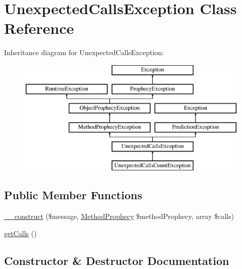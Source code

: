 \hypertarget{class_prophecy_1_1_exception_1_1_prediction_1_1_unexpected_calls_exception}{}\section{Unexpected\+Calls\+Exception Class Reference}
\label{class_prophecy_1_1_exception_1_1_prediction_1_1_unexpected_calls_exception}
Inheritance diagram for Unexpected\+Calls\+Exception\+:\begin{figure}[H]
\begin{center}
\leavevmode
\includegraphics[height=5.544555cm]{class_prophecy_1_1_exception_1_1_prediction_1_1_unexpected_calls_exception}
\end{center}
\end{figure}
\subsection*{Public Member Functions}
\begin{DoxyCompactItemize}
\item 
\mbox{\hyperlink{class_prophecy_1_1_exception_1_1_prediction_1_1_unexpected_calls_exception_ad7e1dce2e789b80fdbc62704d552c673}{\+\_\+\+\_\+construct}} (\$message, \mbox{\hyperlink{class_prophecy_1_1_prophecy_1_1_method_prophecy}{Method\+Prophecy}} \$method\+Prophecy, array \$calls)
\item 
\mbox{\hyperlink{class_prophecy_1_1_exception_1_1_prediction_1_1_unexpected_calls_exception_a52b6d4f7073bed7e7a59451b02d8f8c5}{get\+Calls}} ()
\end{DoxyCompactItemize}


\subsection{Constructor \& Destructor Documentation}
\mbox{\label{class_prophecy_1_1_exception_1_1_prediction_1_1_unexpected_calls_exception_ad7e1dce2e789b80fdbc62704d552c673}} 

